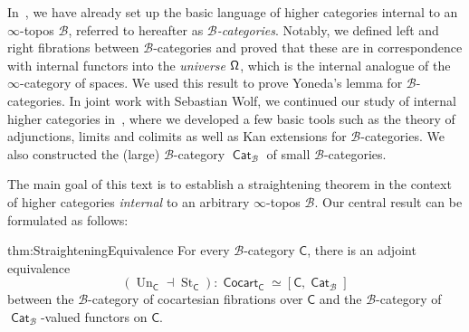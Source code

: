 \documentclass[reqno]{amsart}
\numberwithin{equation}{subsection}
\theoremstyle{plain}
\theoremstyle{definition}
\let\scr=\mathcal
\def\BB{\scr B}
\DeclareMathOperator{\ICat}{\mathsf{Cat}}
\DeclareMathOperator{\ICocart}{\mathsf{Cocart}}
\DeclareMathOperator{\St}{St}
\DeclareMathOperator{\Un}{Un}
\newcommand{\I}[1]{\mathsf{#1}}
\newcommand{\iFun}[2]{{[#1,#2]}}
\begin{document}
 In~\cite{Martini2021}, we have already set up the basic language of higher categories internal to an $\infty$-topos $\BB$, referred to hereafter as \emph{$\BB$-categories}. Notably, we defined left and right fibrations between $\BB$-categories and proved that these are in correspondence with internal functors into the \emph{universe} $\Univ$, which is the internal analogue of the $\infty$-category of spaces. We used this result to prove Yoneda's lemma for $\BB$-categories. In joint work with Sebastian Wolf, we continued our study of internal higher categories in~\cite{Martini2021a}, where we developed a few basic tools such as the theory of adjunctions, limits and colimits as well as Kan extensions for $\BB$-categories. We also constructed the (large) $\BB$-category $\ICat_{\BB}$ of small $\BB$-categories. 
 
 The main goal of this text is to establish a straightening theorem in the context of higher categories \emph{internal} to an arbitrary $\infty$-topos $\BB$. Our central result can be formulated as follows:
\begin{reptheorem}{thm:StraighteningEquivalence}
	For every $\BB$-category $\I{C}$, there is an adjoint equivalence
	\begin{equation*}
	(\Un_{\I{C}}\dashv\St_{\I{C}})\colon \ICocart_{\I{C}}\simeq\iFun{\I{C}}{\ICat_{\BB}}
	\end{equation*}
	between the $\BB$-category of cocartesian fibrations over $\I{C}$ and the $\BB$-category of $\ICat_{\BB}$-valued functors on $\I{C}$.
\end{reptheorem}
\end{document}
